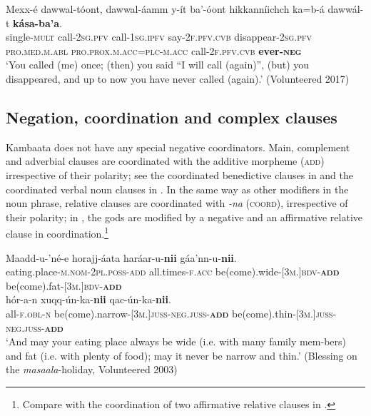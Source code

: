 \documentclass[output=paper,colorlinks,citecolor=brown,draftmode
]{langscibook}
\begin{document}
\ea\label{ex:treis:51} 
\gll Mexx-é			dawwal-tóont,	dawwal-áamm		y-ít			ba’-óont	hikkanníichch		ka=b-á									dawwál-t	\textbf{kása-ba’a}.\\
single-\textsc{mult}	call-\textsc{2sg.pfv}		call-\textsc{1sg.ipfv}			say-\textsc{2f.pfv.cvb}	disappear-\textsc{2sg.pfv} \textsc{pro.med.m.abl}	\textsc{pro.prox.m.acc=plc-m.acc}	call-\textsc{2f.pfv.cvb}	\textbf{ever-\textsc{neg}}\\
\glt ‘You called (me) once; (then) you said “I will call (again)”, (but) you disappeared, and up to now you have never called (again).’ (Volunteered 2017)
\z 

\subsection{Negation, coordination and complex clauses}\label{sec:treis:4.5}

Kambaata does not have any special negative coordinators. Main, complement and adverbial clauses are coordinated with the additive morpheme (\textsc{add}) irrespective of their polarity; see the coordinated benedictive clauses in  and the coordinated verbal noun clauses in . In the same way as other modifiers in the noun phrase, relative clauses are coordinated with \textit{-na} (\textsc{coord}), irrespective of their polarity; in , the gods are modified by a negative and an affirmative relative clause in coordination.\footnote{Compare with the coordination of two affirmative relative clauses in .}

\ea\label{ex:treis:52} 
\gll Maadd-u-'né-e horajj-áata haráar-u-\textbf{nii} gáa'nn-u-\textbf{nii}. \\
 eating.place-\textsc{m.nom-2pl.poss-add} all.times-\textsc{f.acc} be(come).wide-\textsc{[3m.]bdv-\textbf{add}} be(come).fat-\textsc{[3m.]bdv-\textbf{add}}\\ \newline 
\gll hór-a-n xuqq-ún-ka-\textbf{nii} qac-ún-ka-\textbf{nii}.\\
all-\textsc{f.obl-n} be(come).narrow-\textsc{[3m.]juss-neg.juss-\textbf{add}} be(come).thin-\textsc{[3m.]juss-neg.juss-\textbf{add}}\\
\glt ‘And may your eating place always be wide (i.e. with many family mem-\hspace{0pt}bers) and fat (i.e. with plenty of food); may it never be narrow and thin.’ (Blessing on the \textit{masaala}-holiday, Volunteered 2003)
\z 
\end{document}
